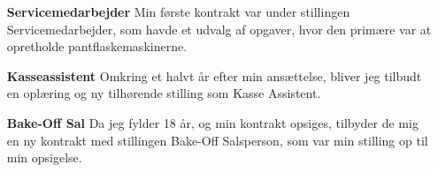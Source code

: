 \documentclass[a4paper]{report}
\begin{document}
\begin{longtabu}
\begin{itemize}[leftmargin=11em]
        \item[\textbf{Servicemedarbejder}] Min første kontrakt var under stillingen 
            Servicemedarbejder, som havde et udvalg af opgaver, hvor den primære var at
            opretholde pantflaskemaskinerne.
        \item[\textbf{Kasseassistent}] Omkring et halvt år efter min ansættelse, bliver
            jeg tilbudt en oplæring og ny tilhørende stilling som Kasse Assistent.
        \item[\textbf{Bake-Off Sal}] Da jeg fylder 18 år, og min kontrakt opsiges,
            tilbyder de mig en ny kontrakt med stillingen Bake-Off Salsperson, som var min stilling
            op til min opsigelse.
    \end{itemize}
\end{longtabu}
\end{document}
